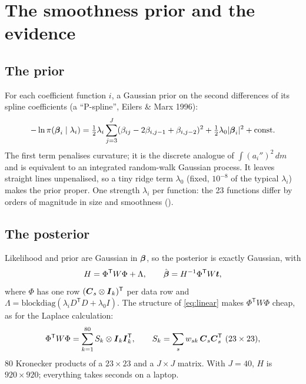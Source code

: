 \section{The smoothness prior and the evidence}
\label{sec:prior}

\subsection{The prior}

For each coefficient function $i$, a Gaussian prior on the second differences of its spline
coefficients (a ``P-spline'', Eilers \& Marx 1996):
\begin{equation}
  -\ln \pi(\boldsymbol{\beta}_i \mid \lambda_i) = \tfrac12\lambda_i \sum_{j=3}^{J}
  (\beta_{ij} - 2\beta_{i,j-1} + \beta_{i,j-2})^2 + \tfrac12\lambda_0|\boldsymbol{\beta}_i|^2 + \text{const}.
  \label{eq:prior}
\end{equation}
The first term penalises curvature; it is the discrete analogue of $\int (a_i'')^2\,dm$ and
is equivalent to an integrated random-walk Gaussian process. It leaves straight lines
unpenalised, so a tiny ridge term $\lambda_0$ (fixed, $10^{-8}$ of the typical $\lambda_i$)
makes the prior proper. One strength $\lambda_i$ per function: the 23 functions differ by
orders of magnitude in size and smoothness ().

\subsection{The posterior}

Likelihood and prior are Gaussian in $\boldsymbol{\beta}$, so the posterior is exactly Gaussian, with
\begin{equation}
  H = \Phi^{\mathsf T} W \Phi + \Lambda, \qquad
  \hat{\boldsymbol{\beta}} = H^{-1}\Phi^{\mathsf T} W \boldsymbol t ,
\end{equation}
where $\Phi$ has one row $(\boldsymbol{C}_s\otimes\boldsymbol I_k)^{\mathsf T}$ per data row and
$\Lambda = \mathrm{blockdiag}(\lambda_i D^{\mathsf T}D + \lambda_0 I)$. The structure of
\cref{eq:linear} makes $\Phi^{\mathsf T}W\Phi$ cheap, as for the Laplace calculation:
\begin{equation}
  \Phi^{\mathsf T} W \Phi = \sum_{k=1}^{80} S_k \otimes \boldsymbol I_k\boldsymbol I_k^{\mathsf T},
  \qquad S_k = \sum_{s} w_{sk}\,\bC_s\bC_s^{\mathsf T}\ (23\times23),
\end{equation}
80 Kronecker products of a $23\times23$ and a $J\times J$ matrix. With $J = 40$, $H$ is
$920\times920$; everything takes seconds on a laptop.

